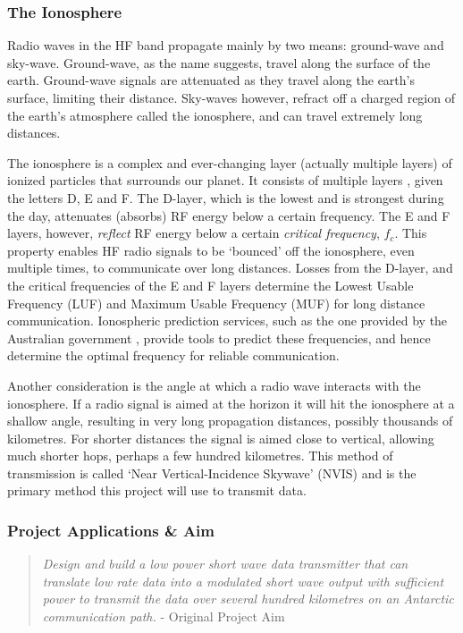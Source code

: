 \documentclass[a4paper,12pt]{article}
\begin{document}
\subsubsection*{The Ionosphere}

Radio waves in the HF band propagate mainly by two means: ground-wave and sky-wave. Ground-wave, as the name suggests, travel along the surface of the earth. Ground-wave signals are attenuated as they travel along the earth's surface, limiting their distance. Sky-waves however, refract off a charged region of the earth's atmosphere called the ionosphere, and can travel extremely long distances.

The ionosphere is a complex and ever-changing layer (actually multiple layers) of ionized particles that surrounds our planet. It consists of multiple layers , given the letters D, E and F. The D-layer, which is the lowest and is strongest during the day, attenuates (absorbs) RF energy below a certain frequency. The E and F layers, however, \textit{reflect} RF energy below a certain \textit{critical frequency}, $f_c$. This property enables HF radio signals to be `bounced' off the ionosphere, even multiple times, to communicate over long distances. Losses from the D-layer, and the critical frequencies of the E and F layers determine the Lowest Usable Frequency (LUF) and Maximum Usable Frequency (MUF) for long distance communication. Ionospheric prediction services, such as the one provided by the Australian government \citep{ref:bom}, provide tools to predict these frequencies, and hence determine the optimal frequency for reliable communication.

Another consideration is the angle at which a radio wave interacts with the ionosphere. If a radio signal is aimed at the horizon it will hit the ionosphere at a shallow angle, resulting in very long propagation distances, possibly thousands of kilometres. For shorter distances the signal is aimed close to vertical, allowing much shorter hops, perhaps a few hundred kilometres. This method of transmission is called `Near Vertical-Incidence Skywave' (NVIS) and is the primary method this project will use to transmit data.

\subsubsection*{Project Applications \& Aim}


\begin{quote}
\textit{
Design and build a low power short wave data transmitter that can translate low rate data into a modulated short wave output with sufficient power to transmit the data over several hundred kilometres on an Antarctic communication path.}
- Original Project Aim
\end{quote}
\end{document}
